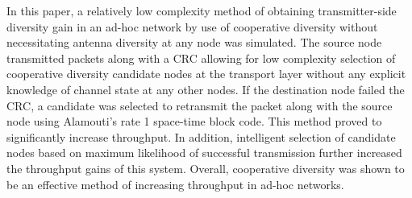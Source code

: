 In this paper, a relatively low complexity method of obtaining transmitter-side diversity gain in an ad-hoc network by use of cooperative diversity without necessitating antenna diversity at any node was simulated.
The source node transmitted packets along with a CRC allowing for low complexity selection of cooperative diversity candidate nodes at the transport layer without any explicit knowledge of channel state at any other nodes.
If the destination node failed the CRC, a candidate was selected to retransmit the packet along with the source node using Alamouti's rate 1 space-time block code.
This method proved to significantly increase throughput.
In addition, intelligent selection of candidate nodes based on maximum likelihood of successful transmission further increased the throughput gains of this system.
Overall, cooperative diversity was shown to be an effective method of increasing throughput in ad-hoc networks.